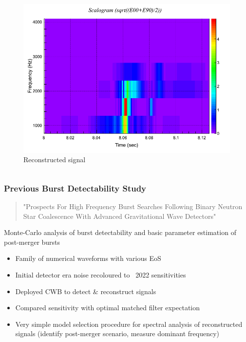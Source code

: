 \documentclass[serif,mathserif,10pt]{beamer}
\let\oldframetitle\frametitle%
\renewcommand{\frametitle}[1]{%
      \oldframetitle{#1}\setstretch{1.2}}
\begin{document}
\begin{frame}
\begin{columns}
        \begin{center}
            \vspace{-0.1cm}
            \begin{figure}
                \includegraphics[width=0.7\columnwidth]{figures/L1_wf_white_rec_tf.png}
                \caption{Reconstructed signal}
            \end{figure}
        \end{center}

    \end{columns}

\end{frame}

\begin{frame}
    \frametitle{Previous Burst Detectability Study}
    \begin{quote}
        "Prospects For High Frequency Burst Searches Following Binary Neutron
        Star Coalescence With Advanced Gravitational Wave Detectors"
    \end{quote}

    Monte-Carlo analysis of burst detectability and basic parameter estimation
    of post-merger bursts
    \begin{itemize}
        \item Family of numerical waveforms with various EoS
        \item Initial detector era noise recoloured to ~2022 sensitivities
        \item Deployed CWB to detect \& reconstruct signals
        \item Compared sensitivity with optimal matched filter expectation
        \item Very simple model selection procedure for spectral analysis of
            reconstructed signals (identify post-merger scenario, measure
            dominant frequency)
    \end{itemize}

    

\end{frame}
\end{document}
